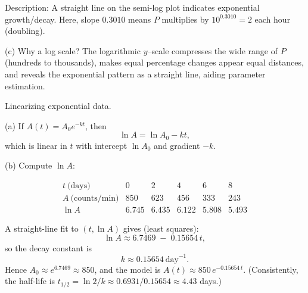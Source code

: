 \documentclass[11pt]{article}
\def\textbf#1{#1}%
\begin{document}
\begin{solution}
\textbf{Description:} A straight line on the semi-log plot indicates exponential growth/decay. Here, slope $0.3010$ means $P$ multiplies by $10^{0.3010}\!=\!2$ each hour (doubling).

\medskip
\textbf{(c) Why a log scale?} The logarithmic $y$–scale compresses the wide range of $P$ (hundreds to thousands), makes equal percentage changes appear equal distances, and reveals the exponential pattern as a straight line, aiding parameter estimation.
\end{solution}


\begin{solution}
\textbf{Linearizing exponential data.}

\textbf{(a)} If $A(t)=A_0e^{-kt}$, then
\[
\ln A=\ln A_0-kt,
\]
which is linear in $t$ with intercept $\ln A_0$ and gradient $-k$.

\textbf{(b)} Compute $\ln A$:

\[
\begin{array}{c|ccccc}
t\ \text{(days)} & 0 & 2 & 4 & 6 & 8\\\hline
A\ \text{(counts/min)} & 850 & 623 & 456 & 333 & 243\\
\ln A & 6.745 & 6.435 & 6.122 & 5.808 & 5.493
\end{array}
\]

A straight-line fit to $(t,\ln A)$ gives (least squares):
\[
\ln A \approx 6.7469 \;-\;0.15654\,t,
\]
so the decay constant is
\[
k \approx 0.15654\ \text{day}^{-1}.
\]
Hence $A_0\approx e^{6.7469}\approx 850$, and the model is $A(t)\approx 850\,e^{-0.15654\,t}$.  
(Consistently, the half-life is $t_{1/2}=\ln 2/k\approx 0.6931/0.15654\approx 4.43$ days.)

\begin{center}
\end{center}
\end{solution}
\end{document}
